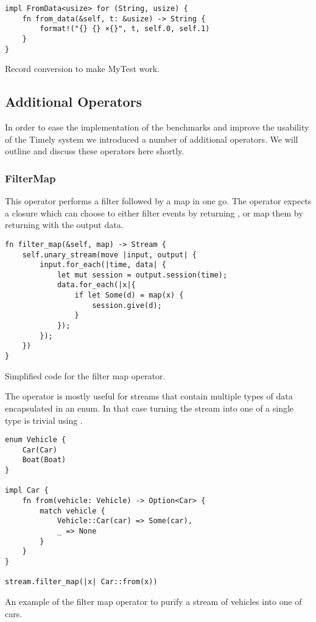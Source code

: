 \begin{listing}[H]
\begin{verbatim}
impl FromData<usize> for (String, usize) {
    fn from_data(&self, t: &usize) -> String {
        format!("{} {} ×{}", t, self.0, self.1)
    }
}
\end{verbatim}
  \caption{Record conversion to make MyTest work.}
  \label{lst:endpoint-conversion}
\end{listing}

\subsection{Additional Operators}
In order to ease the implementation of the benchmarks and improve the usability of the Timely system we introduced a number of additional operators. We will outline and discuss these operators here shortly.

\subsubsection{FilterMap}
This operator performs a filter followed by a map in one go. The operator expects a closure which can choose to either filter events by returning , or map them by returning  with the output data.

\begin{listing}[H]
\begin{verbatim}
fn filter_map(&self, map) -> Stream {
    self.unary_stream(move |input, output| {
        input.for_each(|time, data| {
            let mut session = output.session(time);
            data.for_each(|x|{
                if let Some(d) = map(x) {
                    session.give(d);
                }
            });
        });
    })
}
\end{verbatim}
  \caption{Simplified code for the filter map operator.}
  \label{lst:filtermap}
\end{listing}

The operator is mostly useful for streams that contain multiple types of data encapsulated in an enum. In that case turning the stream into one of a single type is trivial using .

\begin{listing}[H]
\begin{verbatim}
enum Vehicle {
    Car(Car)
    Boat(Boat)
}

impl Car { 
    fn from(vehicle: Vehicle) -> Option<Car> {
        match vehicle {
            Vehicle::Car(car) => Some(car),
            _ => None
        }
    }
}

stream.filter_map(|x| Car::from(x))
\end{verbatim}
\caption{An example of the filter map operator to purify a stream of vehicles into one of cars.}
\label{lst:filtermap-example}
\end{listing}

